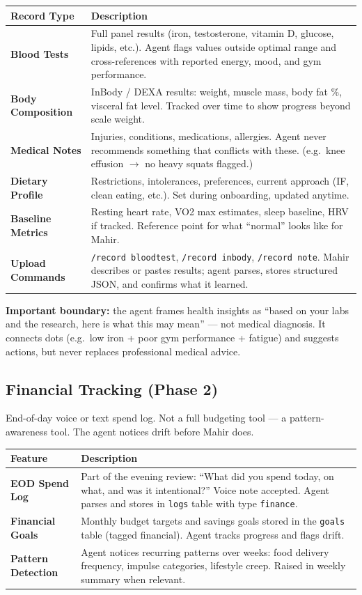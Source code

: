 \documentclass[12pt, a4paper]{article}
\begin{document}
\begin{longtable}{>{\bfseries}p{4cm} p{10cm}}
\toprule
Record Type & Description \\
\midrule
Blood Tests & Full panel results (iron, testosterone, vitamin D, glucose, lipids, etc.). Agent flags values outside optimal range and cross-references with reported energy, mood, and gym performance. \\
\addlinespace
Body Composition & InBody / DEXA results: weight, muscle mass, body fat \%, visceral fat level. Tracked over time to show progress beyond scale weight. \\
\addlinespace
Medical Notes & Injuries, conditions, medications, allergies. Agent never recommends something that conflicts with these. (e.g.\ knee effusion $\rightarrow$ no heavy squats flagged.) \\
\addlinespace
Dietary Profile & Restrictions, intolerances, preferences, current approach (IF, clean eating, etc.). Set during onboarding, updated anytime. \\
\addlinespace
Baseline Metrics & Resting heart rate, VO2 max estimates, sleep baseline, HRV if tracked. Reference point for what ``normal'' looks like for Mahir. \\
\addlinespace
Upload Commands & \texttt{/record bloodtest}, \texttt{/record inbody}, \texttt{/record note}. Mahir describes or pastes results; agent parses, stores structured JSON, and confirms what it learned. \\
\bottomrule
\end{longtable}

\textbf{Important boundary:} the agent frames health insights as ``based on your labs and the research, here is what this may mean'' --- not medical diagnosis. It connects dots (e.g.\ low iron + poor gym performance + fatigue) and suggests actions, but never replaces professional medical advice.

\subsection{Financial Tracking (Phase 2)}

End-of-day voice or text spend log. Not a full budgeting tool --- a pattern-awareness tool. The agent notices drift before Mahir does.

\begin{longtable}{>{\bfseries}p{4cm} p{10cm}}
\toprule
Feature & Description \\
\midrule
EOD Spend Log & Part of the evening review: ``What did you spend today, on what, and was it intentional?'' Voice note accepted. Agent parses and stores in \texttt{logs} table with type \texttt{finance}. \\
\addlinespace
Financial Goals & Monthly budget targets and savings goals stored in the \texttt{goals} table (tagged financial). Agent tracks progress and flags drift. \\
\addlinespace
Pattern Detection & Agent notices recurring patterns over weeks: food delivery frequency, impulse categories, lifestyle creep. Raised in weekly summary when relevant. \\
\bottomrule
\end{longtable}
\end{document}

